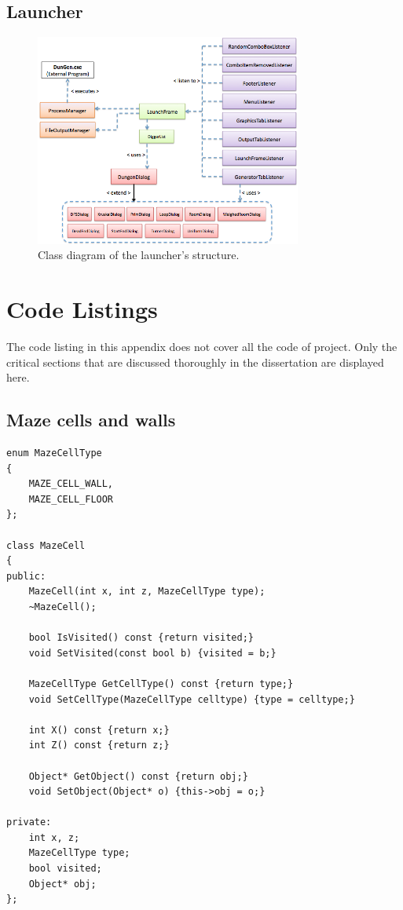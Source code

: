 \pagebreak
\subsection{Launcher}
\begin{figure}[h!]
\centering
 \includegraphics[width=0.78\textwidth]{images/uml_launcher0.png}
\caption{Class diagram of the launcher's structure.}
\end{figure}


\section{Code Listings}
The code listing in this appendix does not cover all the code of project. Only the critical sections that are discussed thoroughly in the dissertation are displayed here.

\subsection {Maze cells and walls}
\lstCpp
\begin{lstlisting}[caption= The \texttt{MazeCell} class]
enum MazeCellType
{
    MAZE_CELL_WALL,
    MAZE_CELL_FLOOR
};

class MazeCell
{
public:
    MazeCell(int x, int z, MazeCellType type);
    ~MazeCell();
    
    bool IsVisited() const {return visited;}
    void SetVisited(const bool b) {visited = b;}
    
    MazeCellType GetCellType() const {return type;}
    void SetCellType(MazeCellType celltype) {type = celltype;}
    
    int X() const {return x;}
    int Z() const {return z;}
    
    Object* GetObject() const {return obj;}
    void SetObject(Object* o) {this->obj = o;}
    
private:
    int x, z;
    MazeCellType type;
    bool visited;
    Object* obj;
};
\end{lstlisting}

